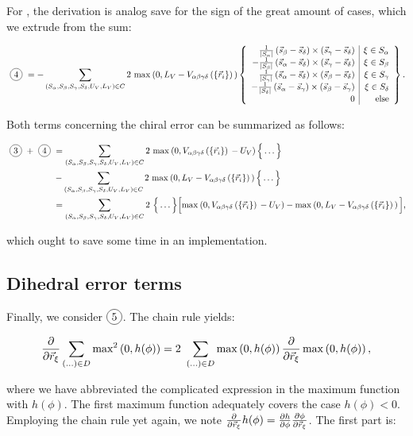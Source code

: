 \documentclass[a4paper]{article}
\newcommand*\circled[1]{
  \tikz[baseline=(char.base)]{
    \node[shape=circle,draw,inner sep=2pt] (char) {#1};
  }
}
\begin{document}
For \circled{4}, the derivation is analog save for the sign of the great amount
of cases, which we extrude from the sum:

\begin{equation}
  \text{\circled{4}} = - \chiralSum 2\ \chiralErrorSecondTerm{} \left\{ \begin{array}{r | r}
    \frac{1}{|S_\alpha|} \avgVecDiff{\beta}{\delta} \times \avgVecDiff{\gamma}{\delta} & \xi \in S_\alpha\\
    - \frac{1}{|S_\beta|} \avgVecDiff{\alpha}{\delta} \times \avgVecDiff{\gamma}{\delta} & \xi \in S_\beta\\
    \frac{1}{|S_\gamma|} \avgVecDiff{\alpha}{\delta} \times \avgVecDiff{\beta}{\delta} & \xi \in S_\gamma\\
    - \frac{1}{|S_\delta|} \avgVecDiff{\alpha}{\gamma} \times \avgVecDiff{\beta}{\gamma} & \xi \in S_\delta\\
    0 & \textrm{else}
  \end{array} \right\}.
\end{equation}

Both terms concerning the chiral error can be summarized as follows:

\begin{align*}
  \text{\circled{3}} + \text{\circled{4}} &=\chiralSum 2\ \chiralErrorFirstTerm{} \Big\{ \ldots \Big\}\\
  &- \chiralSum 2\ \chiralErrorSecondTerm{} \Big\{ \ldots \Big\}\\
  &= \chiralSum 2\ \Big\{ \ldots \Big\} \Big[ 
    \chiralErrorFirstTerm{} - \chiralErrorSecondTerm{} 
  \Big],
\end{align*}

which ought to save some time in an implementation.

\newpage
\subsection{Dihedral error terms}

Finally, we consider $\circled{5}$. The chain rule yields:

\begin{equation}
  \frac{\partial}{\partial\vec{r}_{\xi}} \sum_{(\ldots) \in D} \textrm{max}^2 \left(0, h(\phi)\right)
  = 2\ \sum_{(\ldots) \in D} \max\left(0, h(\phi)\right) 
    \frac{\partial}{\partial\vec{r}_{\xi}} \max\left(0, h(\phi)\right),
\end{equation}

where we have abbreviated the complicated expression in the maximum function
with $h(\phi)$. The first maximum function adequately covers the case
$h(\phi) < 0$. Employing the chain rule yet again, we note 
$\frac{\partial}{\partial\vec{r}_{\xi}} h(\phi) = \frac{\partial h}{\partial \phi}
\frac{\partial \phi}{\partial \vec{r}_{\xi}}$. The first part is:
\end{document}
